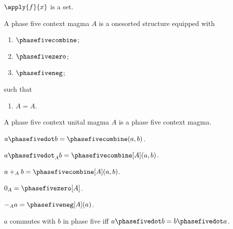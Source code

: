\begin{signature}\label{phase5_context_apply}
    $\apply{f}{x}$ is a set.
\end{signature}

\begin{struct}\label{phase5_context_magma}
    A phase five context magma $A$ is a onesorted structure equipped with
    \begin{enumerate}
        \item $\phasefivecombine$;
        \item $\phasefivezero$;
        \item $\phasefiveneg$;
    \end{enumerate}
    such that
    \begin{enumerate}
        \item\label{phase5_context_refl} $A = A$.
    \end{enumerate}
\end{struct}

\begin{struct}\label{phase5_context_unital_magma}
    A phase five context unital magma $A$ is a phase five context magma.
\end{struct}

\begin{abbreviation}\label{phase5_context_dot}
    $a\phasefivedot b = \phasefivecombine(a,b)$.
\end{abbreviation}

\begin{abbreviation}\label{phase5_context_indexed_dot}
    $a\phasefivedot_{A} b = \phasefivecombine[A](a,b)$.
\end{abbreviation}

\begin{abbreviation}\label{phase5_context_indexed_plus}
    $a+_{A}b = \phasefivecombine[A](a,b)$.
\end{abbreviation}

\begin{abbreviation}\label{phase5_context_indexed_zero}
    $0_{A} = \phasefivezero[A]$.
\end{abbreviation}

\begin{abbreviation}\label{phase5_context_indexed_negation}
    $-_{A}a = \phasefiveneg[A](a)$.
\end{abbreviation}

\begin{abbreviation}\label{phase5_context_commutes}
    $a$ commutes with $b$ in phase five iff
    $a\phasefivedot b = b\phasefivedot a$.
\end{abbreviation}

